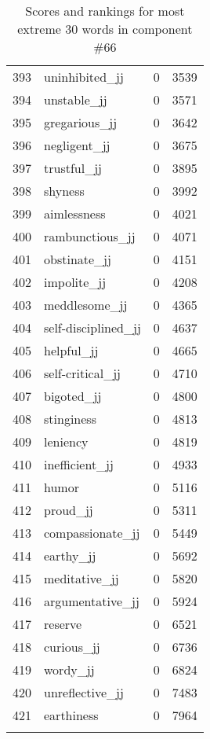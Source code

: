 \begin{longtable}[!htbp]{| rlr@{.}l |}
    393 & uninhibited\_jj & 0 & 3539 \\
    394 & unstable\_jj & 0 & 3571 \\
    395 & gregarious\_jj & 0 & 3642 \\
    396 & negligent\_jj & 0 & 3675 \\
    397 & trustful\_jj & 0 & 3895 \\
    398 & shyness & 0 & 3992 \\
    399 & aimlessness & 0 & 4021 \\
    400 & rambunctious\_jj & 0 & 4071 \\
    401 & obstinate\_jj & 0 & 4151 \\
    402 & impolite\_jj & 0 & 4208 \\
    403 & meddlesome\_jj & 0 & 4365 \\
    404 & self-disciplined\_jj & 0 & 4637 \\
    405 & helpful\_jj & 0 & 4665 \\
    406 & self-critical\_jj & 0 & 4710 \\
    407 & bigoted\_jj & 0 & 4800 \\
    408 & stinginess & 0 & 4813 \\
    409 & leniency & 0 & 4819 \\
    410 & inefficient\_jj & 0 & 4933 \\
    411 & humor & 0 & 5116 \\
    412 & proud\_jj & 0 & 5311 \\
    413 & compassionate\_jj & 0 & 5449 \\
    414 & earthy\_jj & 0 & 5692 \\
    415 & meditative\_jj & 0 & 5820 \\
    416 & argumentative\_jj & 0 & 5924 \\
    417 & reserve & 0 & 6521 \\
    418 & curious\_jj & 0 & 6736 \\
    419 & wordy\_jj & 0 & 6824 \\
    420 & unreflective\_jj & 0 & 7483 \\
    421 & earthiness & 0 & 7964 \\
    \hline
    \caption{Scores and rankings for most extreme 30 words in component \#66} \\
\end{longtable}
